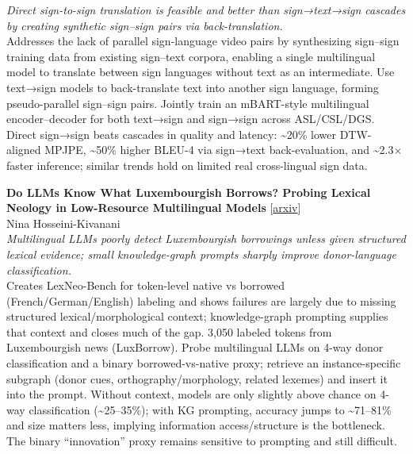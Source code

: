 \documentclass[12pt,letterpaper]{article}
\begin{document}
{\small\textit{Direct sign-to-sign translation is feasible and better than sign→text→sign cascades by creating synthetic sign--sign pairs via back-translation.}}\\[1pt]
{\footnotesize Addresses the lack of parallel sign-language video pairs by synthesizing sign--sign training data from existing sign--text corpora, enabling a single multilingual model to translate between sign languages without text as an intermediate. Use text→sign models to back-translate text into another sign language, forming pseudo-parallel sign--sign pairs. Jointly train an mBART-style multilingual encoder--decoder for both text→sign and sign→sign across ASL/CSL/DGS. Direct sign→sign beats cascades in quality and latency: \textasciitilde{}20\% lower DTW-aligned MPJPE, \textasciitilde{}50\% higher BLEU-4 via sign→text back-evaluation, and \textasciitilde{}2.3× faster inference; similar trends hold on limited real cross-lingual sign data.}

\medskip

{\small\textbf{Do LLMs Know What Luxembourgish Borrows? Probing Lexical Neology in Low-Resource Multilingual Models}} {\scriptsize[\href{https://arxiv.org/abs/2605.21227}{arxiv}]}\\
{\scriptsize Nina Hosseini-Kivanani}\\

{\small\textit{Multilingual LLMs poorly detect Luxembourgish borrowings unless given structured lexical evidence; small knowledge-graph prompts sharply improve donor-language classification.}}\\[1pt]
{\footnotesize Creates LexNeo-Bench for token-level native vs borrowed (French/German/English) labeling and shows failures are largely due to missing structured lexical/morphological context; knowledge-graph prompting supplies that context and closes much of the gap. 3,050 labeled tokens from Luxembourgish news (LuxBorrow). Probe multilingual LLMs on 4-way donor classification and a binary borrowed-vs-native proxy; retrieve an instance-specific subgraph (donor cues, orthography/morphology, related lexemes) and insert it into the prompt. Without context, models are only slightly above chance on 4-way classification (\textasciitilde{}25--35\%); with KG prompting, accuracy jumps to \textasciitilde{}71--81\% and size matters less, implying information access/structure is the bottleneck. The binary ``innovation'' proxy remains sensitive to prompting and still difficult.}

\medskip
\end{document}
